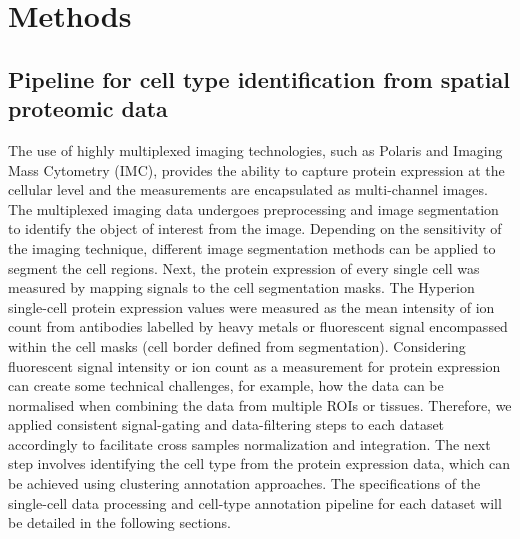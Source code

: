 \section{Methods}
\subsection{Pipeline for cell type identification from spatial proteomic data}
\label{Sec:3.2_SP_celltype_id_pipeline}	%
The use of highly multiplexed imaging technologies, such as Polaris and Imaging Mass Cytometry (IMC), provides the ability to capture protein expression at the cellular level and the measurements are encapsulated as multi-channel images. The multiplexed imaging data undergoes preprocessing and image segmentation to identify the object of interest from the image. Depending on the sensitivity of the imaging technique, different image segmentation methods can be applied to segment the cell regions. Next, the protein expression of every single cell was measured by mapping signals to the cell segmentation masks. The Hyperion single-cell protein expression values were measured as the mean intensity of ion count from antibodies labelled by heavy metals or fluorescent signal encompassed within the cell masks (\ie cell border defined from segmentation). Considering fluorescent signal intensity or ion count as a measurement for protein expression can create some technical challenges, for example, how the data can be normalised when combining the data from multiple ROIs or tissues. Therefore, we applied consistent signal-gating and data-filtering steps to each dataset accordingly to facilitate cross samples normalization and integration. The next step involves identifying the cell type from the protein expression data, which can be achieved using clustering annotation approaches. The specifications of the single-cell data processing and cell-type annotation pipeline for each dataset will be detailed in the following sections.  

